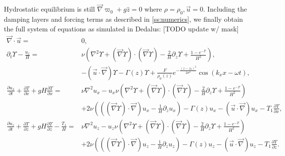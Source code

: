 \documentclass[
        fleqn,
        usenatbib,
    ]{mnras}
\newcommand*{\pd}[2]{\frac{\partial#1}{\partial#2}}
\newcommand*{\p}[1]{\left(#1\right)}
\begin{document}
Hydrostatic equilibrium is still $\vec{\nabla} \varpi_0 + g\hat{z} = 0$ where
$\rho = \rho_0, \vec{u} = 0$. Including the damping layers and forcing terms as
described in \autoref{ss:numerics}, we finally obtain the full system of
equations as simulated in Dedalus: [TODO update w/ mask]
\begin{subequations}
    \begin{align}
        \vec{\nabla} \cdot \vec{u} ={}& 0,\\
        \partial_t \Upsilon - \frac{u_z}{H}
            ={}& \nu\p{\nabla^2 \Upsilon + \p{\vec{\nabla}
            \Upsilon} \cdot \p{\vec{\nabla}\Upsilon} - \frac{2}{H}\partial_z
            \Upsilon + \frac{1 - e^{-\Upsilon}}{H^2}},\nonumber\\
            & - \p{\vec{u} \cdot \vec{\nabla}}\Upsilon
                -\Gamma(z) \Upsilon
                + \frac{F}{\rho_0(z)}e^{-\frac{(z - z_0)^2}{2\sigma^2}}
                    \cos \p{k_xx - \omega t},\\
        \pd{u_x}{t} + \pd{T}{x} + gH\pd{\Upsilon}{x} ={}&
            \nu \nabla^2 u_x
            - u_x \nu\p{\nabla^2 \Upsilon + \p{\vec{\nabla} \Upsilon} \cdot
                \p{\vec{\nabla}\Upsilon} - \frac{2}{H}\partial_z \Upsilon
                + \frac{1 - e^{-\Upsilon}}{H^2}}\nonumber\\
            &+ 2\nu \p{\p{\p{\vec{\nabla}\Upsilon} \cdot \vec{\nabla}}u_x
                - \frac{1}{H}\partial_z u_x}
            -\Gamma(z) u_x
                - \p{\vec{u} \cdot \vec{\nabla}}u_x
                - T_1 \pd{\Upsilon}{x},\\
        \pd{u_z}{t} + \pd{T}{z} + gH\pd{\Upsilon}{z} - \frac{T_1}{H} ={}&
            \nu \nabla^2 u_z
            - u_z \nu\p{\nabla^2 \Upsilon + \p{\vec{\nabla} \Upsilon} \cdot
                \p{\vec{\nabla}\Upsilon} - \frac{2}{H}\partial_z \Upsilon
                + \frac{1 - e^{-\Upsilon}}{H^2}}\nonumber\\
            &+ 2\nu \p{\p{\p{\vec{\nabla}\Upsilon} \cdot \vec{\nabla}}u_z -
                \frac{1}{H}\partial_z u_{z}}
            -\Gamma(z) u_z - \p{\vec{u} \cdot \vec{\nabla}}u_z
            - T_1 \pd{\Upsilon}{z}.
    \end{align}
\end{subequations}
\label{lastpage} %
\end{document}
